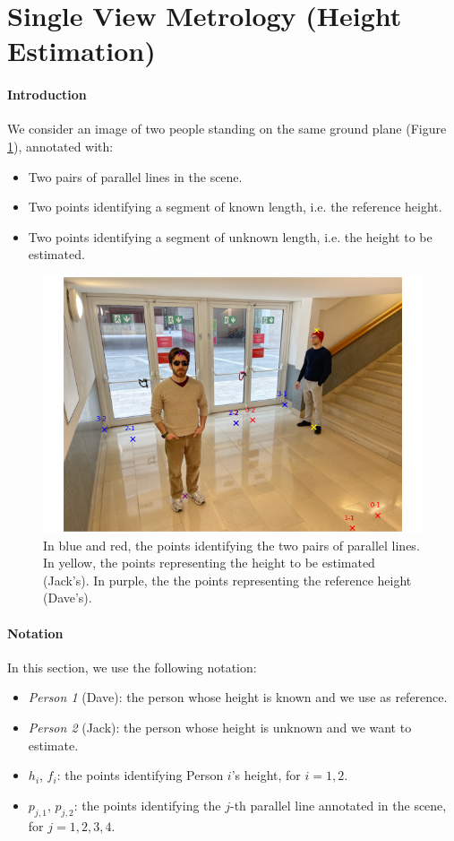 \section{Single View Metrology (Height Estimation)}

\paragraph{Introduction} We consider an image of two people standing on the same ground plane (Figure \ref{fig:annotated_points}), annotated with:

\begin{itemize}
    \item Two pairs of parallel lines in the scene.
    \item Two points identifying a segment of known length, i.e. the reference height. 
    \item Two points identifying a segment of unknown length, i.e. the height to be estimated.
\end{itemize}

\begin{figure}
    \centering
    \includegraphics[width=0.5\linewidth]{img/annotated_points.png}
    \caption{In blue and red, the points identifying the two pairs of parallel lines. In yellow, the points representing the height to be estimated (Jack's). In purple, the the points representing the reference height (Dave's).}
    \label{fig:annotated_points}
\end{figure}

\paragraph{Notation} In this section, we use the following notation:

\begin{itemize}
    \item \textit{Person 1} (Dave): the person whose height is known and we use as reference.
    \item \textit{Person 2} (Jack): the person whose height is unknown and we want to estimate.
    \item $h_i$, $f_i$: the points identifying Person $i$'s height, for $i=1,2$.
    \item $p_{j,1}$, $p_{j,2}$: the points identifying the $j$-th parallel line annotated in the scene, for $j=1,2,3,4$.
\end{itemize}

